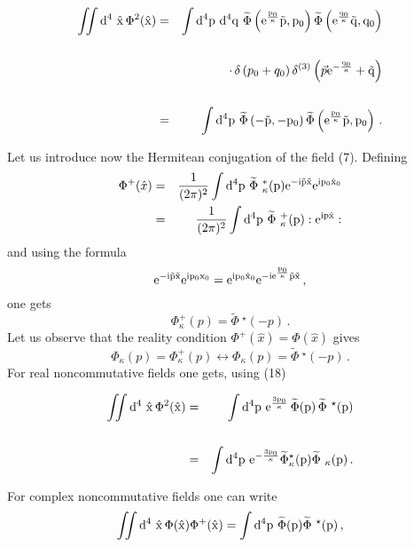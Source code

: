 \documentclass[a4paper,a4paper]{article}
\newcommand\E{\rm e}
\newcommand\D{\rm d }
\begin{document}
\begin{eqnarray}
\int\!\!\!\int \D^{4}\  \hat{x} \, \Phi^{2}(\hat{x}) &= &
\int \D^{4} p \ \D^{4} q \
\widetilde{\Phi} \left( \E^{{p_{0}\over \kappa}} \vec{p}, p_{0}\right)
\widetilde{\Phi} \left( \E^{{q_{0}\over \kappa}} \vec{q}, q_{0}\right)
\cr\cr
& &\,\cdot \, \delta\left(p_{0}+q_{0}\right)  \delta^{(3)}
\left(\vec{p} \E^{-{q_{0}\over \kappa}} + \vec{q} \right)
\cr\cr
& = &
\int \D^{4} p\
\widetilde{\Phi} \left( 
-  \vec{p}, - p_{0}\right)
\widetilde{\Phi}\left( \E^{{p_{0}\over \kappa}}  \vec{p}
,p_{0}\right)\, .
\end{eqnarray}

Let us introduce now the Hermitean conjugation of the field (7). 
Defining
\begin{eqnarray}
 \Phi^{+}(\hat{x}) &=
&
 {1\over (2\pi)^{2}} 
\int \D^{4} p\  \widetilde{\Phi}\ ^{*}_{\kappa}(p)
 \E^{- i{\vec{p}}{\vec{x}} }
 \E^{i p_{0} \hat{x}_{0}} 
 \cr
 &=&
   {1\over (2\pi)^{2}} 
 \int \D^{4} p \ \widetilde{\Phi}\ ^{+}_{\kappa}(p):
 \E^{i{{p}}{\hat{x}} }:
\end{eqnarray}
and using the formula
\begin{equation}
 \E^{- i{\vec{p}}{\vec{x}} }
 \E^{i p_{0} {x}_{0} } =
\E^{ip_{0} \hat{x}_{0}} 
 \E^{-i e^{p_{0}\over \kappa} \vec{p} \vec{x}}\, ,
 \end{equation}
 one gets
 \begin{equation}
  \Phi^{+}_{\kappa} (p) 
  =
    \widetilde{\Phi}\ ^{\star}(-p) \, .
\end{equation}
Let us observe that the reality condition 
$  \Phi^{+}(\hat{x}) = 
  \Phi(\hat{x})$ gives
  \begin{equation}
    \Phi_{\kappa}(p) =
      \Phi^{+}_{\kappa}(p) \leftrightarrow
    \Phi_{\kappa}(p) =
     \widetilde{ \Phi}\ ^{\star}(-p) \, .
     \end{equation}
     For real noncommutative fields one gets, using (18)
     
     
     
     
\begin{eqnarray}
\int\!\!\!\int \D^{4}\  \hat{x} \, \Phi^{2}(\hat{x}) &= &
\int \D^{4} p\  
 \E^{{3 p_{0}\over \kappa}} 
\, \widetilde{\Phi} (p)
\, \widetilde{\Phi}\ ^{\star}(p)
\cr\cr
&=&
\int \D^{4} p  \
 \E^{-{ 3 p_{0}\over \kappa}} 
\widetilde{\Phi}^{\star}_{\kappa} (p)
\widetilde{\Phi}\ _{\kappa}(p)\, .
     \end{eqnarray}
     
For complex noncommutative fields one can write
\renewcommand{\theequation}{20\alph{equation}}
\setcounter{equation}{0}
\begin{equation}
\int\!\!\!\int \D^{4}\  \hat{x} \, \Phi(\hat{x})  \Phi^{+}(\hat{x}) 
=
\int\D^{4} p\
 \widetilde{ \Phi}(p) 
    \widetilde{\Phi}\ ^{\star}(p)\, ,
\end{equation}
\end{document}
